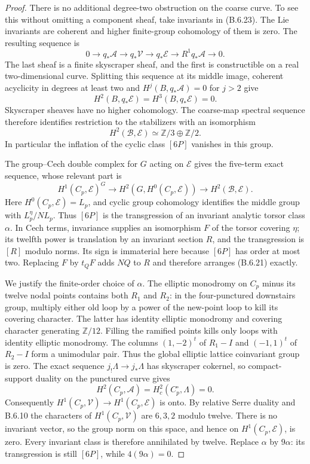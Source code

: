 \begin{proof}
There is no additional degree-two obstruction on the coarse
curve. To see this without omitting a component sheaf, take
invariants in (B.6.23). The Lie invariants are coherent and
higher finite-group cohomology of them is zero. The resulting
sequence is
\[
 0\longrightarrow q_*\mathcal A\longrightarrow q_*\mathcal V
  \longrightarrow q_*\mathcal E
  \longrightarrow R^1q_*\mathcal A\longrightarrow0.
\]
The last sheaf is a finite skyscraper sheaf, and the first is
constructible on a real two-dimensional curve. Splitting this
sequence at its middle image, coherent acyclicity in degrees
at least two and $H^j(B,q_*\mathcal A)=0$ for $j>2$ give
\[
 H^2(B,q_*\mathcal E)=H^3(B,q_*\mathcal E)=0.
\]
Skyscraper sheaves have no higher cohomology. The coarse-map
spectral sequence therefore identifies restriction to the
stabilizers with an isomorphism
\[
 H^2(\mathcal B,\mathcal E)\simeq
       \mathbb Z/3\oplus\mathbb Z/2.
 \tag{B.6.24}
\]
In particular the inflation of the cyclic class $[6P]$
vanishes in this group.

The group--Cech double complex for $G$ acting on
$\mathcal E$ gives the five-term exact sequence, whose
relevant part is
\[
 H^1(C_p,\mathcal E)^G\longrightarrow
 H^2(G,H^0(C_p,\mathcal E))\longrightarrow
 H^2(\mathcal B,\mathcal E).
 \tag{B.6.25}
\]
Here $H^0(C_p,\mathcal E)=L_p$, and cyclic group cohomology
identifies the middle group with $L_p^\eta/NL_p$.
Thus $[6P]$ is the transgression of an invariant analytic
torsor class $\alpha$. In Cech terms, invariance supplies
an isomorphism $F$ of the torsor covering $\eta$; its
twelfth power is translation by an invariant section $R$,
and the transgression is $[R]$ modulo norms. Its sign is
immaterial here because $[6P]$ has order at most two.
Replacing $F$ by $t_QF$ adds $NQ$ to $R$ and therefore
arranges (B.6.21) exactly.

We justify the finite-order choice of $\alpha$.
The elliptic monodromy on $C_p$ minus its twelve nodal
points contains both $R_1$ and $R_2$: in the four-punctured
downstairs group, multiply either old loop by a power of
the new-point loop to kill its covering character. The
latter has identity elliptic monodromy and covering
character generating $\mathbb Z/12$. Filling the ramified
points kills only loops with identity elliptic monodromy.
The columns $(1,-2)^t$ of $R_1-I$ and $(-1,1)^t$ of
$R_2-I$ form a unimodular pair. Thus the global elliptic
lattice coinvariant group is zero. The exact sequence
$j_!\Lambda\to j_*\Lambda$ has skyscraper cokernel,
so compact-support duality on the punctured curve gives
\[
 H^2(C_p,\mathcal A)=H^2_c(C_p^\circ,\Lambda)=0.
\]
Consequently $H^1(C_p,\mathcal V)\to H^1(C_p,\mathcal E)$
is onto. By relative Serre duality and B.6.10 the characters
of $H^1(C_p,\mathcal V)$ are $6,3,2$ modulo twelve.
There is no invariant vector, so the group norm on this
space, and hence on $H^1(C_p,\mathcal E)$, is zero.
Every invariant class is therefore annihilated by twelve.
Replace $\alpha$ by $9\alpha$: its transgression is still
$[6P]$, while $4(9\alpha)=0$.


\end{proof}
